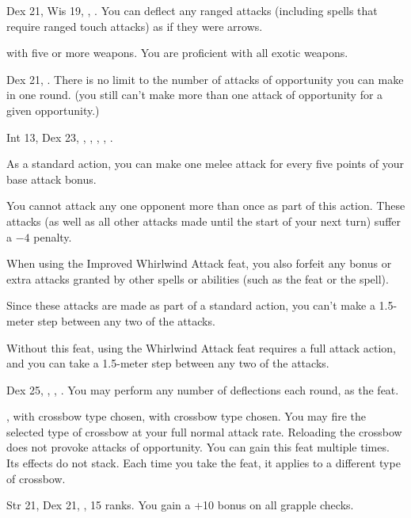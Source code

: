 {Dex 21, Wis 19, , .}
{You can deflect any ranged attacks (including spells that require ranged touch attacks) as if they were arrows.}

{ with five or more weapons.}
{You are proficient with all exotic weapons.}

{Dex 21, .}
{There is no limit to the number of attacks of opportunity you can make in one round. (you still can't make more than one attack of opportunity for a given opportunity.)}

{}
{Int 13, Dex 23, , , , , .}
{As a standard action, you can make one melee attack for every five points of your base attack bonus.

You cannot attack any one opponent more than once as part of this action. These attacks (as well as all other attacks made until the start of your next turn) suffer a $-4$ penalty.

When using the Improved Whirlwind Attack feat, you also forfeit any bonus or extra attacks granted by other spells or abilities (such as the  feat or the  spell).

Since these attacks are made as part of a standard action, you can't make a 1.5-meter step between any two of the attacks.}
{Without this feat, using the Whirlwind Attack feat requires a full attack action, and you can take a 1.5-meter step between any two of the attacks.}
{}

{Dex 25, , , .}
{You may perform any number of deflections each round, as the  feat.}

{}
{,  with crossbow type chosen,  with crossbow type chosen.}
{You may fire the selected type of crossbow at your full normal attack rate. Reloading the crossbow does not provoke attacks of opportunity.}
{}{You can gain this feat multiple times. Its effects do not stack. Each time you take the feat, it applies to a different type of crossbow.}

{Str 21, Dex 21, ,  15 ranks.}
{You gain a +10 bonus on all grapple checks.}



